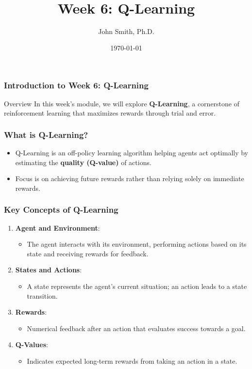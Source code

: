 \documentclass[aspectratio=169]{beamer}
\title[Q-Learning]{Week 6: Q-Learning}
\author[J. Smith]{John Smith, Ph.D.}
\institute[University Name]{
  Department of Computer Science\\
  University Name\\
  \vspace{0.3cm}
  Email: email@university.edu\\
  Website: www.university.edu
}
\date{\today}
\begin{document}
\frame{\titlepage}

\begin{frame}[fragile]
    \frametitle{Introduction to Week 6: Q-Learning}
    \begin{block}{Overview}
        In this week’s module, we will explore \textbf{Q-Learning}, a cornerstone of reinforcement learning that maximizes rewards through trial and error.
    \end{block}
\end{frame}

\begin{frame}[fragile]
    \frametitle{What is Q-Learning?}
    \begin{itemize}
        \item Q-Learning is an off-policy learning algorithm helping agents act optimally by estimating the \textbf{quality (Q-value)} of actions.
        \item Focus is on achieving future rewards rather than relying solely on immediate rewards.
    \end{itemize}
\end{frame}

\begin{frame}[fragile]
    \frametitle{Key Concepts of Q-Learning}
    \begin{enumerate}
        \item \textbf{Agent and Environment}:
            \begin{itemize}
                \item The agent interacts with its environment, performing actions based on its state and receiving rewards for feedback.
            \end{itemize}
        \item \textbf{States and Actions}:
            \begin{itemize}
                \item A state represents the agent's current situation; an action leads to a state transition.
            \end{itemize}
        \item \textbf{Rewards}:
            \begin{itemize}
                \item Numerical feedback after an action that evaluates success towards a goal.
            \end{itemize}
        \item \textbf{Q-Values}:
            \begin{itemize}
                \item Indicates expected long-term rewards from taking an action in a state.
            \end{itemize}
    \end{enumerate}
\end{frame}
\end{document}

